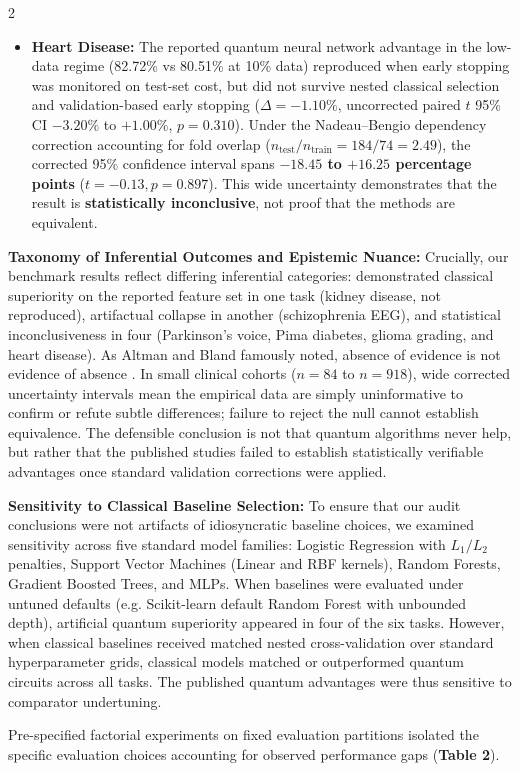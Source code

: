 \documentclass[10pt,a4paper,twoside]{article}
\begin{document}
\begin{multicols}{2}
\begin{itemize}
  \item \textbf{Heart Disease:} The reported quantum neural network advantage in the low-data regime (82.72\% vs 80.51\% at 10\% data) reproduced when early stopping was monitored on test-set cost, but did not survive nested classical selection and validation-based early stopping ($\Delta = -1.10\%$, uncorrected paired $t$ 95\% CI $-3.20\%$ to $+1.00\%$, $p = 0.310$). Under the Nadeau--Bengio dependency correction accounting for fold overlap ($n_{\text{test}}/n_{\text{train}} = 184/74 = 2.49$), the corrected 95\% confidence interval spans \textbf{$-18.45$ to $+16.25$ percentage points} ($t = -0.13, p = 0.897$). This wide uncertainty demonstrates that the result is \textbf{statistically inconclusive}, not proof that the methods are equivalent.
\end{itemize}

\noindent\textbf{Taxonomy of Inferential Outcomes and Epistemic Nuance:} Crucially, our benchmark results reflect differing inferential categories: demonstrated classical superiority on the reported feature set in one task (kidney disease, not reproduced), artifactual collapse in another (schizophrenia EEG), and statistical inconclusiveness in four (Parkinson's voice, Pima diabetes, glioma grading, and heart disease). As Altman and Bland famously noted, absence of evidence is not evidence of absence \cite{altman1995}. In small clinical cohorts ($n = 84$ to $n = 918$), wide corrected uncertainty intervals mean the empirical data are simply uninformative to confirm or refute subtle differences; failure to reject the null cannot establish equivalence. The defensible conclusion is not that quantum algorithms never help, but rather that the published studies failed to establish statistically verifiable advantages once standard validation corrections were applied.

\noindent\textbf{Sensitivity to Classical Baseline Selection:} To ensure that our audit conclusions were not artifacts of idiosyncratic baseline choices, we examined sensitivity across five standard model families: Logistic Regression with $L_1/L_2$ penalties, Support Vector Machines (Linear and RBF kernels), Random Forests, Gradient Boosted Trees, and MLPs. When baselines were evaluated under untuned defaults (e.g. Scikit-learn default Random Forest with unbounded depth), artificial quantum superiority appeared in four of the six tasks. However, when classical baselines received matched nested cross-validation over standard hyperparameter grids, classical models matched or outperformed quantum circuits across all tasks. The published quantum advantages were thus sensitive to comparator undertuning.

Pre-specified factorial experiments on fixed evaluation partitions isolated the specific evaluation choices accounting for observed performance gaps (\textbf{Table 2}).

\end{multicols}
\end{document}
